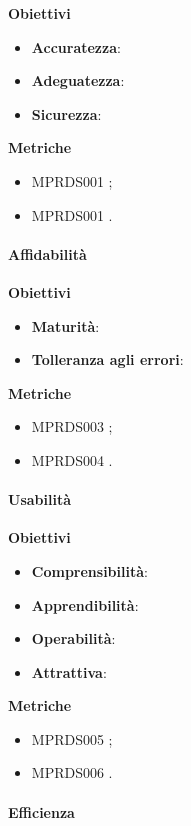 \textbf{Obiettivi}
\begin{itemize}
\item \textbf{Accuratezza}:
\item \textbf{Adeguatezza}:
\item \textbf{Sicurezza}:
\end{itemize}

\textbf{Metriche}
\begin{itemize}
\item MPRDS001 ;
\item MPRDS001 .
\end{itemize}

\paragraph{Affidabilità}

\textbf{Obiettivi}
\begin{itemize}
\item \textbf{Maturità}:
\item \textbf{Tolleranza agli errori}:
\end{itemize}

\textbf{Metriche}
\begin{itemize}
\item MPRDS003 ;
\item MPRDS004 .
\end{itemize}

\paragraph{Usabilità}

\textbf{Obiettivi}
\begin{itemize}
\item \textbf{Comprensibilità}:
\item \textbf{Apprendibilità}:
\item \textbf{Operabilità}:
\item \textbf{Attrattiva}:
\end{itemize}

\textbf{Metriche}
\begin{itemize}
\item MPRDS005 ;
\item MPRDS006 .
\end{itemize}


\paragraph{Efficienza}

